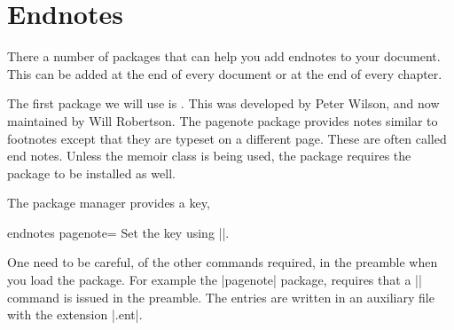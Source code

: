 \chapter{Endnotes}

There a number of packages that can help you add endnotes to your document.
This can be added at the end of every document or at the end of every chapter.

The first package we will use is . This was developed by Peter Wilson, 
and now maintained by Will Robertson. The pagenote package provides notes similar to footnotes except that
they are typeset on a different page. These are often called end notes.
Unless the memoir class is being used, the package requires the 
package to be installed as well.

The package manager provides a key,


\begin{docKey}[phd]{endnotes pagenote=  }{}{}
 Set the key using ||.
\end{docKey}

One need to be careful, of the other commands required, in the preamble when you load the package. For example the |pagenote| package, requires that a |\makepagenote| command is issued in the preamble.
The entries are written in an auxiliary file with the extension |.ent|. 



